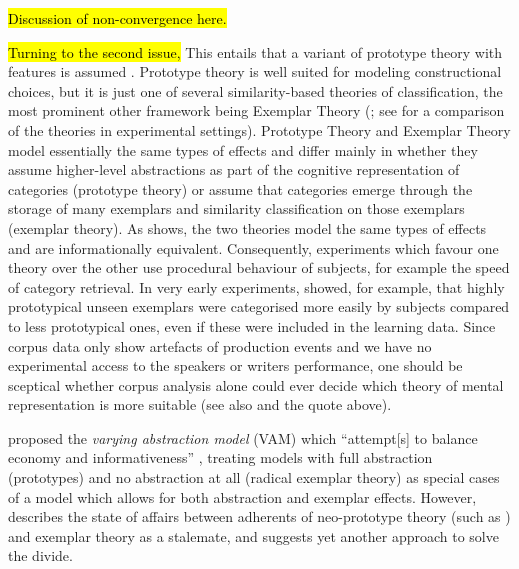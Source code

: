 \hl{Discussion of non-convergence here.}


\hl{Turning to the second issue, }
This entails that a variant of prototype theory with features is assumed \citep{Rosch1978}.
Prototype theory is well suited for modeling constructional choices, but it is just one of several similarity-based theories of classification, the most prominent other framework being Exemplar Theory (\citealp{MedinSchaffer1978,Hintzman1986}; see \citealp{StormsEa2000} for a comparison of the theories in experimental settings).
Prototype Theory and Exemplar Theory model essentially the same types of effects and differ mainly in whether they assume higher-level abstractions as part of the cognitive representation of categories (prototype theory) or assume that categories emerge through the storage of many exemplars and similarity classification on those exemplars (exemplar theory).
As \cite{Barsalou1990} shows, the two theories model the same types of effects and are informationally equivalent.
Consequently, experiments which favour one theory over the other use procedural behaviour of subjects, for example the speed of category retrieval.
In very early experiments, \cite{PosnerKeele1968} showed, for example, that highly prototypical unseen exemplars were categorised more easily by subjects compared to less prototypical ones, even if these were included in the learning data.
Since corpus data only show artefacts of production events and we have no experimental access to the speakers or writers performance, one should be sceptical whether corpus analysis alone could ever decide which theory of mental representation is more suitable (see also \citealp[22]{Gries2003} and the \citealp[486--487]{Dabrowska2016} quote above).



\cite{VanpaemelStorms2008,LeeVanpaemel2008} proposed the \textit{varying abstraction model} (VAM) which ``attempt[s] to balance economy and informativeness'' \citep[745]{LeeVanpaemel2008}, treating models with full abstraction (prototypes) and no abstraction at all (radical exemplar theory) as special cases of a model which allows for both abstraction and exemplar effects.
However, \cite[183--184]{Vanpaemel2016} describes the state of affairs between adherents of neo-prototype theory (such as \citealp{MindaSmith2001,MindaSmith2002}) and exemplar theory as a stalemate, and suggests yet another approach to solve the divide.

